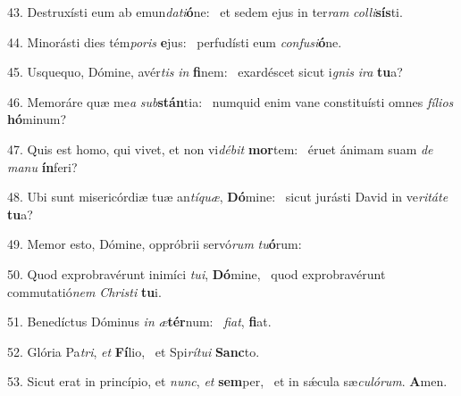 43. Destruxísti eum ab emun\textit{da}\textit{ti}\textbf{ó}ne: \ast\  et sedem ejus in ter\textit{ram} \textit{col}\textit{li}\textbf{sís}ti.\

44. Minorásti dies tém\textit{po}\textit{ris} \textbf{e}jus: \ast\  perfudísti eum \textit{con}\textit{fu}\textit{si}\textbf{ó}ne.\

45. Usquequo, Dómine, avér\textit{tis} \textit{in} \textbf{fi}nem: \ast\  exardéscet sicut i\textit{gnis} \textit{i}\textit{ra} \textbf{tu}a?\

46. Memoráre quæ me\textit{a} \textit{sub}\textbf{stán}tia: \ast\  numquid enim vane constituísti omnes \textit{fí}\textit{li}\textit{os} \textbf{hó}minum?\

47. Quis est homo, qui vivet, et non vi\textit{dé}\textit{bit} \textbf{mor}tem: \ast\  éruet ánimam suam \textit{de} \textit{ma}\textit{nu} \textbf{ín}feri?\

48. Ubi sunt misericórdiæ tuæ an\textit{tí}\textit{quæ}, \textbf{Dó}mine: \ast\  sicut jurásti David in ve\textit{ri}\textit{tá}\textit{te} \textbf{tu}a?\

49. Memor esto, Dómine, oppróbrii servó\textit{rum} \textit{tu}\textbf{ó}rum: \ast\  \

50. Quod exprobravérunt inimíci \textit{tu}\textit{i}, \textbf{Dó}mine, \ast\  quod exprobravérunt commutatió\textit{nem} \textit{Chris}\textit{ti} \textbf{tu}i.\

51. Benedíctus Dóminus \textit{in} \textit{æ}\textbf{tér}num: \ast\  \textit{fi}\textit{at}, \textbf{fi}at.\

52. Glória Pa\textit{tri}, \textit{et} \textbf{Fí}lio, \ast\  et Spi\textit{rí}\textit{tu}\textit{i} \textbf{Sanc}to.\

53. Sicut erat in princípio, et \textit{nunc}, \textit{et} \textbf{sem}per, \ast\  et in sǽcula sæ\textit{cu}\textit{ló}\textit{rum}. \textbf{A}men.\

